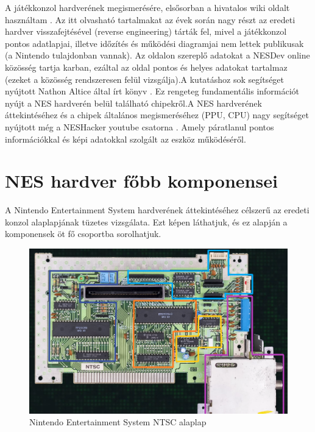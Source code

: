 A játékkonzol hardverének megismerésére, elsősorban a hivatalos wiki oldalt használtam \cite{NESdev_wiki}. Az itt olvasható tartalmakat az évek során nagy részt az eredeti hardver visszafejtésével (reverse engineering) tárták fel, mivel a játékkonzol pontos adatlapjai, illetve időzítés és működési diagramjai nem lettek publikusak (a Nintendo tulajdonban vannak). Az oldalon szereplő adatokat a NESDev online közösség tartja karban, ezáltal az oldal pontos és helyes adatokat tartalmaz (ezeket a közösség rendszeresen felül vizsgálja).A kutatáshoz sok segítséget nyújtott Nathon Altice által írt könyv \cite{IAmError}. Ez rengeteg fundamentális információt nyújt a NES hardverén belül található chipekről.A NES hardverének áttekintéséhez és a chipek általános megismeréséhez (PPU, CPU) nagy segítséget nyújtott még a NESHacker youtube csatorna \cite{Neshacker_youtube}. Amely páratlanul pontos információkkal és képi adatokkal szolgált az eszköz működéséről. 


\section{NES hardver főbb komponensei}
\label{sec:NES-motherboard}

A Nintendo Entertainment System hardverének áttekintéséhez célszerű az eredeti konzol alaplapjának tüzetes vizsgálata. Ezt  képen láthatjuk, és ez alapján a komponensek öt fő csoportba sorolhatjuk.

\begin{figure}[H]
	\centering
	\includegraphics[width=150mm, keepaspectratio]{figures/NES-motherboard-lines}
	\caption{Nintendo Entertainment System NTSC alaplap \cite{NES_hardware}}
	\label{fig:NES-Motherboard}
\end{figure}

